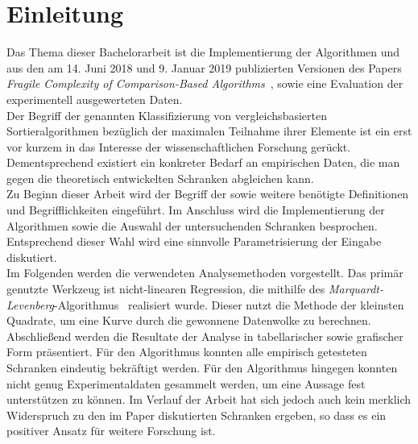 \section{Einleitung}	%

\noindent
Das Thema dieser Bachelorarbeit ist die Implementierung der Algorithmen \Rm und \RM aus den am 14. Juni 2018 und 9. Januar 2019 publizierten Versionen des Papers \textit{Fragile Complexity of Comparison-Based Algorithms}~\cite{meyer1}, sowie eine Evaluation der experimentell ausgewerteten Daten.\\[.1cm]
Der Begriff der \fg genannten Klassifizierung von vergleichsbasierten Sortieralgorithmen bezüglich der maximalen Teilnahme ihrer Elemente ist ein erst vor kurzem in das Interesse der wissenschaftlichen Forschung gerückt. 
Dementsprechend existiert ein konkreter Bedarf an empirischen Daten, die man gegen die theoretisch entwickelten Schranken abgleichen kann.\\[0.05cm]
Zu Beginn dieser Arbeit wird der Begriff der \fg sowie weitere benötigte Definitionen und Begrifflichkeiten eingeführt. Im Anschluss wird die Implementierung der Algorithmen sowie die Auswahl der untersuchenden Schranken besprochen. Entsprechend dieser Wahl wird eine sinnvolle Parametrisierung der Eingabe diskutiert.\\[.05cm]
Im Folgenden werden die verwendeten Analysemethoden vorgestellt. Das primär genutzte Werkzeug ist nicht-linearen Regression, die mithilfe des \textit{Marquardt-Levenberg}-Algorithmus~\cite{gnu2} realisiert wurde. Dieser nutzt die Methode der kleinsten Quadrate, um eine Kurve durch die gewonnene Datenwolke zu berechnen.\\[.05cm]
Abschließend werden die Resultate der Analyse in tabellarischer sowie grafischer Form präsentiert. Für den Algorithmus \Rm konnten alle empirisch getesteten Schranken eindeutig bekräftigt werden. Für den Algorithmus \RM hingegen konnten nicht genug Experimentaldaten gesammelt werden, um eine Aussage fest unterstützen zu können. Im Verlauf der Arbeit hat sich jedoch auch kein merklich Widerspruch zu den im Paper diskutierten Schranken ergeben, so dass es ein positiver Ansatz für weitere Forschung ist.










